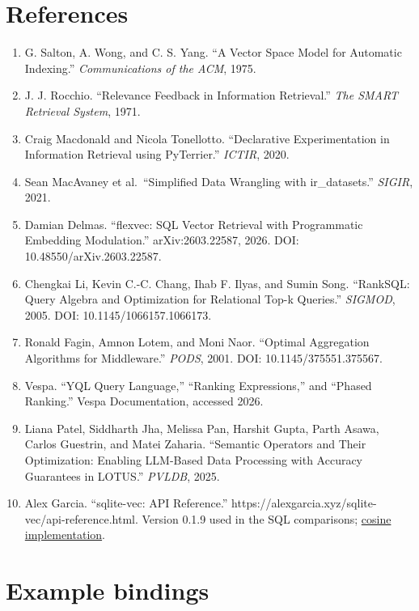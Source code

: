 \documentclass{article}
\providecommand{\tightlist}{\setlength{\itemsep}{0pt}\setlength{\parskip}{0pt}}
\begin{document}
\newpage

\hypertarget{references}{%
\section*{References}\label{references}}

\begin{enumerate}
\raggedright
\def\labelenumi{\arabic{enumi}.}
\tightlist
\item
  G. Salton, A. Wong, and C. S. Yang. ``A Vector Space Model for Automatic Indexing.'' \emph{Communications of the ACM}, 1975.
\item
  J. J. Rocchio. ``Relevance Feedback in Information Retrieval.'' \emph{The SMART Retrieval System}, 1971.
\item
  Craig Macdonald and Nicola Tonellotto. ``Declarative Experimentation in Information Retrieval using PyTerrier.'' \emph{ICTIR}, 2020.
\item
  Sean MacAvaney et al.~``Simplified Data Wrangling with ir\_datasets.'' \emph{SIGIR}, 2021.
\item
  Damian Delmas. ``flexvec: SQL Vector Retrieval with Programmatic Embedding Modulation.'' arXiv:2603.22587, 2026. DOI: 10.48550/arXiv.2603.22587.
\item
  Chengkai Li, Kevin C.-C. Chang, Ihab F. Ilyas, and Sumin Song. ``RankSQL: Query Algebra and Optimization for Relational Top-k Queries.'' \emph{SIGMOD}, 2005. DOI: 10.1145/1066157.1066173.
\item
  Ronald Fagin, Amnon Lotem, and Moni Naor. ``Optimal Aggregation Algorithms for Middleware.'' \emph{PODS}, 2001. DOI: 10.1145/375551.375567.
\item
  Vespa. ``YQL Query Language,'' ``Ranking Expressions,'' and ``Phased Ranking.'' Vespa Documentation, accessed 2026.
\item
  Liana Patel, Siddharth Jha, Melissa Pan, Harshit Gupta, Parth Asawa, Carlos Guestrin, and Matei Zaharia. ``Semantic Operators and Their Optimization: Enabling LLM-Based Data Processing with Accuracy Guarantees in LOTUS.'' \emph{PVLDB}, 2025.
\item
  Alex Garcia. ``sqlite-vec: API Reference.'' https://alexgarcia.xyz/sqlite-vec/api-reference.html. Version 0.1.9 used in the SQL comparisons; \href{https://github.com/asg017/sqlite-vec/blob/v0.1.9/sqlite-vec.c\#L436}{cosine implementation}.
\end{enumerate}

\hypertarget{example-bindings}{%
\section*{Example bindings}\label{example-bindings}}
\end{document}
